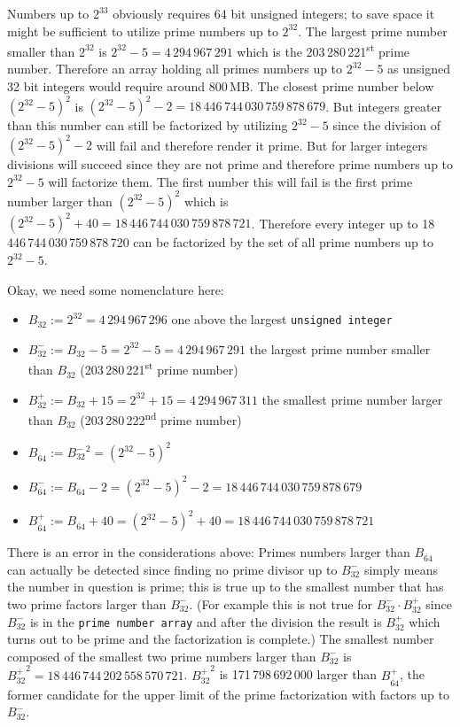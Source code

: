 \documentclass[a4paper,10pt]{article}
\begin{document}
Numbers up to $2^{33}$ obviously requires 64 bit unsigned integers;
to save space it might be sufficient to utilize prime numbers up to $2^{32}$.
The largest prime number smaller than $2^{32}$ is $2^{32} - 5 = 4\,294\,967\,291$
which is the 203\,280\,221\textsuperscript{st} prime number.
Therefore an array holding all primes numbers up to $2^{32} - 5$ as unsigned 32 bit integers would require around 800\,MB.
The closest prime number below $(2^{32} - 5)^2$ is $(2^{32} - 5)^2 - 2 = 18\,446\,744\,030\,759\,878\,679$.
But integers greater than this number can still be factorized by utilizing $2^{32} - 5$
since the division of $(2^{32} - 5)^2 - 2$ will fail
and therefore render it prime.
But for larger integers divisions will succeed
since they are not prime and therefore prime numbers up to $2^{32} - 5$ will factorize them.
The first number this will fail is the first prime number larger than $(2^{32} - 5)^2$
which is $(2^{32} - 5)^2 + 40 = 18\,446\,744\,030\,759\,878\,721$.
Therefore every integer up to 18\,446\,744\,030\,759\,878\,720 can be factorized by the set of all prime numbers up to $2^{32} - 5$.

Okay, we need some nomenclature here:
\begin{itemize}
 \item $B_{32} := 2^{32} = 4\,294\,967\,296$ one above the largest \texttt{unsigned integer}
 \item $B^-_{32} := B_{32} - 5 = 2^{32} - 5 = 4\,294\,967\,291$ the largest prime number smaller than $B_{32}$ (203\,280\,221\textsuperscript{st} prime number)
 \item $B^+_{32} := B_{32} + 15 = 2^{32} + 15 = 4\,294\,967\,311$ the smallest prime number larger than $B_{32}$ (203\,280\,222\textsuperscript{nd} prime number)
 \item $B_{\dot{64}} := {B^-_{32}}^2 = (2^{32} - 5)^2$
 \item $B^-_{\dot{64}} := B_{\dot{64}} - 2 = (2^{32} - 5)^2 - 2 = 18\,446\,744\,030\,759\,878\,679$
 \item $B^+_{\dot{64}} := B_{\dot{64}} + 40 = (2^{32} - 5)^2 + 40 = 18\,446\,744\,030\,759\,878\,721$
\end{itemize}


There is an error in the considerations above:
Primes numbers larger than $B_{\dot{64}}$ can actually be detected
since finding no prime divisor up to $B^-_{32}$ simply means the number in question is prime;
this is true up to the smallest number that has two prime factors larger than $B^-_{32}$.
(For example this is not true for $B^-_{32}\cdot B^+_{32}$
since $B^-_{32}$ is in the \texttt{prime number array}
and after the division the result is $B^+_{32}$ which turns out to be prime and the factorization is complete.)
The smallest number composed of the smallest two prime numbers larger than $B^-_{32}$ is ${B^+_{32}}^2 = 18\,446\,744\,202\,558\,570\,721$.
${B^+_{32}}^2$ is 171\,798\,692\,000 larger than $B^+_{\dot{64}}$,
the former candidate for the upper limit of the prime factorization with factors up to $B^-_{32}$.
\end{document}

